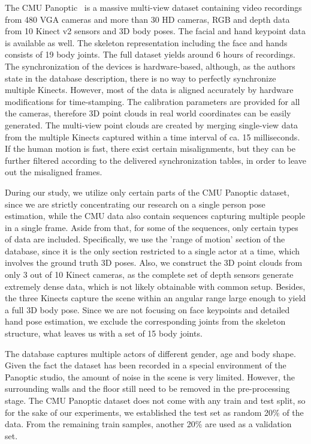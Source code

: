 The CMU Panoptic~\cite{Joo_2017_TPAMI} is a massive multi-view dataset containing video recordings from 480 VGA cameras and more than 30 HD cameras, RGB and depth data from 10 Kinect v2 sensors and 3D body poses. The facial and hand keypoint data is available as well. The skeleton representation including the face and hands consists of 19 body joints. The full dataset yields around 6 hours of recordings. The synchronization of the devices is hardware-based, although, as the authors state in the database description, there is no way to perfectly synchronize multiple Kinects. However, most of the data is aligned accurately by hardware modifications for time-stamping. The calibration parameters are provided for all the cameras, therefore 3D point clouds in real world coordinates can be easily generated. The multi-view point clouds are created by merging single-view data from the multiple Kinects captured within a time interval of ca. 15 milliseconds. If the human motion is fast, there exist certain misalignments, but they can be further filtered according to the delivered synchronization tables, in order to leave out the misaligned frames.\par
\vspace{5mm}
\noindent
During our study, we utilize only certain parts of the CMU Panoptic dataset, since we are strictly concentrating our research on a single person pose estimation, while the CMU data also contain sequences capturing multiple people in a single frame. Aside from that, for some of the sequences, only certain types of data are included. Specifically, we use the 'range of motion' section of the database, since it is the only section restricted to a single actor at a time, which involves the ground truth 3D poses. Also, we construct the 3D point clouds from only 3 out of 10 Kinect cameras, as the complete set of depth sensors generate extremely dense data, which is not likely obtainable with common setup. Besides, the three Kinects capture the scene within an angular range large enough to yield a full 3D body pose. Since we are not focusing on face keypoints and detailed hand pose estimation, we exclude the corresponding joints from the skeleton structure, what leaves us with a set of 15 body joints.\par
\vspace{5mm}
\noindent The database captures multiple actors of different gender, age and body shape. Given the fact the dataset has been recorded in a special environment of the Panoptic studio, the amount of noise in the scene is very limited. However, the surrounding walls and the floor still need to be removed in the pre-processing stage. The CMU Panoptic dataset does not come with any train and test split, so for the sake of our experiments, we established the test set as random 20\% of the data. From the remaining train samples, another 20\% are used as a validation set.

